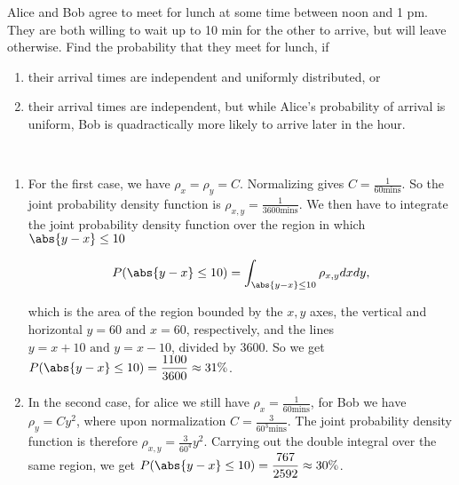 \documentclass[english,a4paper,12pt]{report}
\begin{document}
{Alice and Bob agree to meet for lunch at some time between noon and 1 pm. They are both willing to wait up to 10 min for the other to arrive, but will leave otherwise. Find the probability that they meet for lunch, if
\begin{enumerate}[itemsep=10pt]
	\item their arrival times are independent and uniformly distributed, or
	\item their arrival times are independent, but while Alice's probability of arrival is uniform, Bob is quadractically more likely to arrive later in the hour.    
\end{enumerate}~}
{\begin{enumerate}
    \item For the first case, we have \(\rho _{x} = \rho _{y} = C\). Normalizing gives \(C = \frac{1}{60 \text{mins} } \). So the joint probability density function is \(\rho _{x,y} = \frac{1}{3600 \text{mins} }  \). We then have to integrate the joint probability density function over the region in which \(\abs{y-x} \le 10 \) 
    
    \begin{equation}
        P(\abs{y-x}\le 10 ) = \int_{\abs{y-x} \le 10}^{}\rho _{x,y}dxdy ,
    \end{equation}
    
    which is the area of the region bounded by the \(x,y\) axes, the vertical and horizontal \(y=60 \text { and } x=60\), respectively, and the lines \(y = x+10 \text { and } y = x-10\), divided by 3600. So we get \(\displaystyle P(\abs{y-x}\le 10 ) = \frac{1100}{3600}\approx 31 \% \).
    
    \item In the second case, for alice we still have \(\rho _{x} = \frac{1}{60 \text{mins} }  \), for Bob we have \(\rho _{y}  = Cy^2 \), where upon normalization \(C = \frac{3}{60^3 \text{mins} } \). The joint probability density function is therefore \(\displaystyle \rho _{x,y} = \frac{3}{60^4}y^2\). Carrying out the double integral over the same region, we get \(\displaystyle P(\abs{y-x}\le 10 ) = \frac{767}{2592} \approx 30\% \).  
\end{enumerate}~
} 
\end{document}
